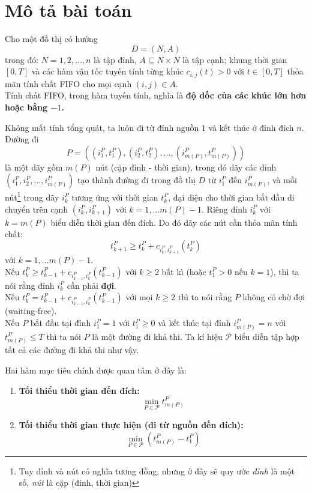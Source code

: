 \documentclass[../main.tex]{subfiles}
\begin{document}
\section{Mô tả bài toán}\label{problem-description}

Cho một đồ thị có hướng 
\[
  D = (N, A)
\] 
trong đó: \(N = {1, 2, ..., n}\)
là tập đỉnh, \(A \subseteq N \times N\) là tập cạnh; khung thời gian
\([0, T]\) và các hàm vận tốc tuyến tính từng khúc
\(c_{i,j}(t) > 0\) với \(t \in [0, T]\) thỏa mãn tính chất FIFO cho mọi
cạnh \((i, j) \in A\).\\
Tính chất FIFO, trong hàm tuyến tính, nghĩa là
\textbf{độ dốc của các khúc lớn hơn hoặc bằng \(-1\).} 

Không mất tính tổng
quát, ta luôn đi từ đỉnh nguồn \(1\) và kết thúc ở đỉnh đích
\(n\). Đường đi
\[
  P=((i_1^P, t_1^P), (i_2^P, t_2^P), \dots, (i_{m(P)}^P, t_{m(P)}^P))
\]
là một dãy gồm \(m(P)\) nút (cặp đỉnh - thời gian), trong đó dãy các đỉnh
\((i_1^P, i_2^P, \dots, i_{m(P)}^P)\) tạo thành đường đi trong đồ thị
\(D\) từ \(i_1^P\) đến \(i_{m(P)}^P\), và mỗi nút\footnote{Tuy đỉnh và nút có nghĩa tương đồng, nhưng ở đây sẽ quy ước \emph{đỉnh} là một số, \emph{nút} là cặp (đỉnh, thời gian)} trong dãy \(i_k^P\)
tương ứng với thời gian \(t_k^P\), đại diện cho thời gian bắt đầu di
chuyển trên cạnh \((i_k^P, i_{k+1}^P)\) với \(k=1, \dots m(P)-1\). Riêng
đỉnh \(i_k^P\) với \(k=m(P)\) biểu diễn thời gian đến đích. Do đó dãy
các nút cần thỏa mãn tính chất:
\[t_{k+1}^P \ge t_k^P + c_{i_k^P, i_{k+1}^P}(t_k^P)\] với
\(k=1, \dots m(P)-1\). \\
Nếu
\(t_{k}^P \ge t_{k-1}^P + c_{i_{k-1}^P, i_{k}^P}(t_{k-1}^P)\) với \(k \ge 2\) bất kì (hoặc \(t_1^P > 0\) nếu \(k=1\)), thì ta nói rằng đỉnh \(i_k^P\)
cần phải \textbf{đợi}.\\ 
Nếu \(t_{k}^P = t_{k-1}^P + c_{i_{k-1}^P, i_{k}^P}(t_{k-1}^P)\) với mọi
\(k \ge 2\) thì ta nói rằng \(P\) không có chờ đợi (waiting-free). \\
Nếu \(P\) bắt đầu tại đỉnh \(i_1^P = 1\) với \(t_1^P\ge0\) và kết thúc tại
đỉnh \(i_{m(P)}^P=n\) với \(t_{m(P)}^P \le T\) thì ta nói \(P\) là một
đường đi khả thi. Ta kí hiệu \(\mathcal{P}\) biểu diễn tập hợp tất cả các
đường đi khả thi như vậy.

Hai hàm mục tiêu chính được quan tâm ở đây là:

\begin{enumerate}
\def\labelenumi{\arabic{enumi}.}
\tightlist
\item
  \textbf{Tối thiểu thời gian đến đích:}
  \[\min_{P\in \mathcal P}t_{m(P)}^P\]
\item
  \textbf{Tối thiểu thời gian thực hiện (đi từ nguồn đến đích):}
  \[\min_{P\in \mathcal P}(t_{m(P)}^P-t_1^P)\]
\end{enumerate}
\end{document}
